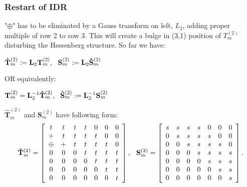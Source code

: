 \documentclass[mathserif]{beamer}
\begin{document}
\begin{frame}
\frametitle{Restart of IDR}

"$\oplus$" has to be eliminated by a Gauss transform on left, $L_2$, adding proper multiple of row 2 to row 3. This will create a bulge in (3,1) position of $T_m^{(2)}$ disturbing the Hessenberg structure. So far we have:
\vspace{.1in}

\hspace{1in} $\mathbf{\hat T}_m^{(2)}:=\mathbf{L}_2 \mathbf{T}_m^{(2)}, \hspace{.09in} \mathbf{S}_m^{(2)}:=\mathbf{L}_2 \mathbf{\hat S}_m^{(2)}$

OR equivalently:
\vspace{.1in}

\hspace{1in} $\mathbf{T}_m^{(2)}=\mathbf{L}_2^{-1} \mathbf{\hat T}_m^{(2)}, \hspace{.09in} \mathbf{\hat S}_m^{(2)}:=\mathbf{L}_2^{-1} \mathbf{S}_m^{(2)}$
\pause

$\mathbf{\hat T}_m^{(2)}$ and $\mathbf{S}_m^{(2)}$ have following form:
\[
\mathbf{\hat T}_m^{(2)}= \left[
\begin{array}{cccccccc}
t & t & t & t  & 0 & 0 & 0 \\
+ & t & t & t  & t & 0 & 0 \\
\oplus & +  & t  & t  & t & t & 0 \\
0 & 0  & 0  & t  & t & t & t \\
0 & 0  & 0  & 0  & t & t & t \\
0 & 0  & 0  & 0  & 0 & t & t\\
0 & 0  & 0  & 0  & 0 & 0 & t \\
\end{array}
\right], \hspace{.1in}
\mathbf{S}_m^{(2)}=\left[
\begin{array}{cccccccc}
s & s & s & s  & 0 & 0 & 0 \\
0 & s & s & s  & s & 0 & 0 \\
0 & 0 & s & s & s & s & 0 \\
0 & 0  & 0  & s & s & s & s \\
0 & 0  & 0  & 0  & s & s & s \\
0 & 0  & 0  & 0  & 0 & s & s\\
0 & 0  & 0  & 0  & 0 & 0 & s \\
\end{array}
\right].
\]
\end{frame}
\end{document}

